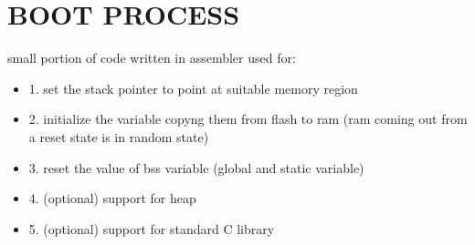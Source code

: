 \section{BOOT PROCESS}
small portion of code written in assembler used for: 
\begin{itemize}
	\item 1. set the stack pointer to point at suitable memory region
	\item 2. initialize the variable copyng them from flash to ram (ram coming out from a reset state is in random state)
	\item 3. reset the value of bss variable (global and static variable)
	\item 4. (optional) support for heap 
	\item 5. (optional) support for standard C library
	\end{itemize}
